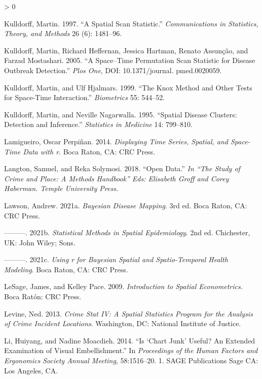 \documentclass[
  krantz2]{krantz}
\newlength{\cslhangindent}
\newenvironment{CSLReferences}[2] %
 {%
  \setlength{\parindent}{0pt}
  \ifodd #1 \everypar{\setlength{\hangindent}{\cslhangindent}}\ignorespaces\fi
  \ifnum #2 > 0
  \setlength{\parskip}{#2\baselineskip}
  \fi
 }%
 {}
\begin{document}
\begin{CSLReferences}{1}{0}
\leavevmode\hypertarget{ref-Kulldorff_1997}{}%
Kulldorff, Martin. 1997. {``A Spatial Scan Statistic.''} \emph{Communications in Statistics, Theory, and Methods} 26 (6): 1481--96.

\leavevmode\hypertarget{ref-Kulldorff_2005}{}%
Kulldorff, Martin, Richard Heffernan, Jessica Hartman, Renato Assunção, and Farzad Mostashari. 2005. {``A Space--Time Permutation Scan Statistic for Disease Outbreak Detection.''} \emph{Plos One}, DOI: 10.1371/journal. pmed.0020059.

\leavevmode\hypertarget{ref-Kulldorff_1999}{}%
Kulldorff, Martin, and Ulf Hjalmars. 1999. {``The Knox Method and Other Tests for Space-Time Interaction.''} \emph{Biometrics} 55: 544--52.

\leavevmode\hypertarget{ref-Kulldorff_1995}{}%
Kulldorff, Martin, and Neville Nagarwalla. 1995. {``Spatial Disease Clusters: Detection and Inference.''} \emph{Statistics in Medicine} 14: 799--810.

\leavevmode\hypertarget{ref-Perpinan_2014}{}%
Lamigueiro, Oscar Perpiñan. 2014. \emph{Displaying Time Series, Spatial, and Space-Time Data with r}. Boca Raton, CA: CRC Press.

\leavevmode\hypertarget{ref-Langton_2018}{}%
Langton, Samuel, and Reka Solymosi. 2018. {``Open Data.''} \emph{In {``The Study of Crime and Place: A Methods Handbook''} Eds: Elisabeth Groff and Corey Haberman. Temple University Press.}

\leavevmode\hypertarget{ref-Lawson_2021a}{}%
Lawson, Andrew. 2021a. \emph{Bayesian Disease Mapping}. 3rd ed. Boca Raton, CA: CRC Press.

\leavevmode\hypertarget{ref-Lawson_2006}{}%
---------. 2021b. \emph{Statistical Methods in Spatial Epidemiology}. 2nd ed. Chichester, UK: John Wiley; Sons.

\leavevmode\hypertarget{ref-Lawson_2021b}{}%
---------. 2021c. \emph{Using r for Bayesian Spatial and Spatio-Temporal Health Modeling}. Boca Raton, CA: CRC Press.

\leavevmode\hypertarget{ref-LeSage_2009}{}%
LeSage, James, and Kelley Pace. 2009. \emph{Introduction to Spatial Econometrics}. Boca Ratón: CRC Press.

\leavevmode\hypertarget{ref-Levine_2013}{}%
Levine, Ned. 2013. \emph{Crime Stat IV: A Spatial Statistics Program for the Analysis of Crime Incident Locations}. Washington, DC: National Institute of Justice.

\leavevmode\hypertarget{ref-Li_2014}{}%
Li, Huiyang, and Nadine Moacdieh. 2014. {``Is {`Chart Junk'} Useful? An Extended Examination of Visual Embellishment.''} In \emph{Proceedings of the Human Factors and Ergonomics Society Annual Meeting}, 58:1516--20. 1. SAGE Publications Sage CA: Los Angeles, CA.


\end{CSLReferences}
\end{document}
